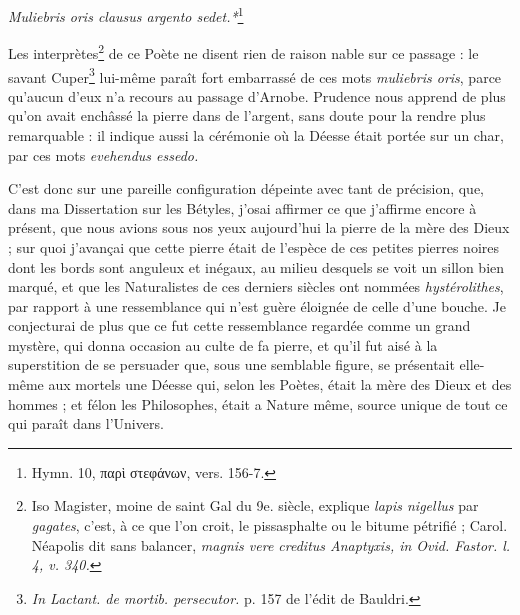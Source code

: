 \documentclass[a4paper, 11pt, oneside, polutonikogreek, french]{article}
\begin{document}
\emph{Muliebris oris clausus argento sedet.*}\footnote{Hymn. 10, παρὶ στεφάνων, vers. 156-7.}

Les interprètes\footnote{Iso Magister, moine de saint Gal du 9e. siècle, explique \emph{lapis nigellus} par \emph{gagates}, c'est, à ce que l'on croit, le pissasphalte ou le bitume pétrifié ; Carol. Néapolis dit sans balancer, \emph{magnis vere creditus Anaptyxis, in Ovid. Fastor. l. 4, v. 340.}} de ce Poète ne disent rien de raison nable sur ce passage : le savant Cuper\footnote{\emph{In Lactant. de mortib. persecutor.} p. 157 de l'édit de Bauldri.} lui-même paraît fort embarrassé de ces mots \emph{muliebris oris}, parce qu'aucun d'eux n'a recours au passage d'Arnobe. Prudence nous apprend de plus qu'on avait enchâssé la pierre dans de l'argent, sans doute pour la rendre plus remarquable : il indique aussi la cérémonie où la Déesse était portée sur un char, par ces mots \emph{evehendus essedo.}

C'est donc sur une pareille configuration dépeinte avec tant de précision, que, dans ma Dissertation sur les Bétyles, j'osai affirmer ce que j'affirme encore à présent, que nous avions sous nos yeux aujourd'hui la pierre de la mère des Dieux ; sur quoi j'avançai que cette pierre était de l'espèce de ces petites pierres noires dont les bords sont anguleux et inégaux, au milieu desquels se voit un sillon bien marqué, et que les Naturalistes de ces derniers siècles ont nommées \emph{hystérolithes}, par rapport à une ressemblance qui n'est guère éloignée de celle d'une bouche. Je conjecturai de plus que ce fut cette ressemblance regardée comme un grand mystère, qui donna occasion au culte de fa pierre, et qu'il fut aisé à la superstition de se persuader que, sous une semblable figure, se présentait elle-même aux mortels une Déesse qui, selon les Poètes, était la mère des Dieux et des hommes ; et félon les Philosophes, était a Nature même, source unique de tout ce qui paraît dans l'Univers.
\end{document}
